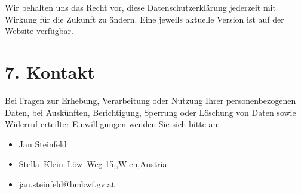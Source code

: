 \documentclass[a4paper,12pt]{article}
\makeatletter
\newcommand{\Strasse}{Stella--Klein--Löw--Weg 15}
\newcommand{\PLZ}{1020}
\newcommand{\Ort}{Wien}
\newcommand{\Land}{Austria}
\newcommand{\email}{jan.steinfeld@bmbwf.gv.at}
\makeatother
\begin{document}
Wir behalten uns das Recht vor, diese Datenschutzerklärung jederzeit mit Wirkung für die Zukunft zu ändern. Eine jeweils aktuelle Version ist auf der Website verfügbar.

\section*{7. Kontakt}

Bei Fragen zur Erhebung, Verarbeitung oder Nutzung Ihrer personenbezogenen Daten, bei Auskünften, Berichtigung, Sperrung oder Löschung von Daten sowie Widerruf erteilter Einwilligungen wenden Sie sich bitte an:

\begin{itemize}
  \item Jan Steinfeld
  \item \Strasse,\quad\PLZ,\quad\Ort,\quad\Land
  \item \email
\end{itemize}
\end{document}
